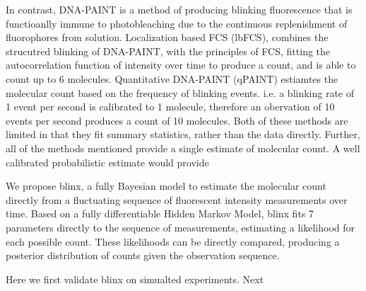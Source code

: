 In contrast, DNA-PAINT is a method of producing blinking fluorescence that is functioanlly
    immune to photobleaching due to the continuous replenishment of fluorophores from solution.
    Localization based FCS (lbFCS), combines the strucutred blinking of DNA-PAINT, with the 
    principles of FCS, fitting the autocorrelation function of intensity over time to produce a count,
    and is able to count up to 6 molecules.
    Quantitative DNA-PAINT (qPAINT) estiamtes the molecular count based on the frequency of blinking events. i.e.
    a blinking rate of 1 event per second is calibrated to 1 molecule, therefore an obervation of 10 events per second
    produces a count of 10 molecules.
    Both of these methods are limited in that they fit summary statistics,
    rather than the data directly. 
    Further, all of the methods mentioned provide a single estimate of molecular count.
    A well calibrated probabilistic estimate would provide 
    
We propose blinx, a fully Bayesian model to estimate the molecular 
  count directly from a fluctuating sequence of fluorescent intensity measurements over time.
  Based on a fully differentiable Hidden Markov Model, blinx fits 7 parameters
  directly to the sequence of measurements, estimating a likelihood for each possible count. 
  These likelihoods can be directly compared, producing a posterior distribution of counts 
  given the observation sequence. 

Here we first validate blinx on simualted experiments. Next